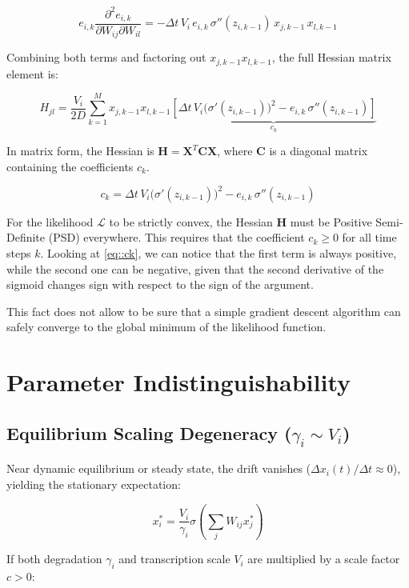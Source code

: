 \documentclass[11pt,onecolumn]{article}
\theoremstyle{definition}
\theoremstyle{remark}
\begin{document}
    $$ e_{i,k} \frac{\partial^2 e_{i,k}}{\partial W_{ij} \partial W_{il}} = - \Delta t \, V_i \, e_{i,k} \, \sigma''(z_{i,k-1}) \, x_{j, k-1} \, x_{l, k-1} $$

Combining both terms and factoring out 
$x_{j, k-1} x_{l, k-1}$, the full Hessian matrix element is:

$$ H_{jl} = \frac{V_i}{2D} \sum_{k=1}^M x_{j, k-1} x_{l, k-1} \underbrace{\left[ \Delta t \, V_i \big(\sigma'(z_{i,k-1})\big)^2 - e_{i,k} \, \sigma''(z_{i,k-1}) \right]}_{c_k} $$

In matrix form, the Hessian is $\mathbf{H} = \mathbf{X}^T \mathbf{C} \mathbf{X}$, where $\mathbf{C}$ is a diagonal matrix containing the coefficients $c_k$. 

\begin{equation}
    c_k = \Delta t \, V_i \big(\sigma'(z_{i,k-1})\big)^2 - e_{i,k} \, \sigma''(z_{i,k-1})
    \label{eq::ck}
\end{equation}

For the likelihood $\mathcal{L}$ to be strictly convex, the Hessian $\mathbf{H}$ must be Positive Semi-Definite (PSD) everywhere. This requires that the coefficient $c_k \ge 0$ for all time steps $k$.
Looking at \ref{eq::ck}, we can notice that the first term is always positive, while the second one can be negative, given that the second derivative of the sigmoid changes sign with respect to the sign of the argument.

This fact does not allow to be sure that a simple gradient descent algorithm can safely converge to the global minimum of the likelihood function. 

\section{Parameter Indistinguishability}

\subsection{Equilibrium Scaling Degeneracy ($\gamma_i \sim V_i$)}

Near dynamic equilibrium or steady state, the drift vanishes ($\Delta x_i(t) / \Delta t \approx 0$), yielding the stationary expectation:

$$x_i^* = \frac{V_i}{\gamma_i} \sigma\left( \sum_j W_{ij} x_j^* \right)$$

If both degradation $\gamma_i$ and transcription scale $V_i$ are multiplied by a scale factor $c > 0$:
\end{document}
